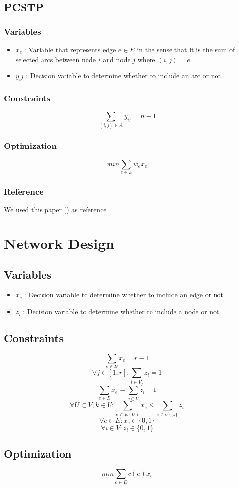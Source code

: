 \documentclass{article}
\begin{document}
\subsection{PCSTP}

\subsubsection{Variables}
\begin{itemize}
	\item $x_e$ : Variable that represents edge $e \in E$ in the sense that it is the sum of selected arcs between node $i$ and node $j$ where $(i,j) = e$ 
	\item $y_ij$ : Decision variable to determine whether to include an arc or not
\end{itemize}

\subsubsection{Constraints}
\[ \sum_{(i,j)\in A}y_{ij} = n-1 \]

\subsubsection{Optimization}
\[ min \sum_{e\in E}w_ex_e \]

\subsubsection{Reference}
We used this paper (\cite{prize_collecting_steiner_tree_problem}) as reference

\clearpage

\section{Network Design}

\subsection{Variables}
\begin{itemize}
	\item $x_e$ : Decision variable to determine whether to include an edge or not
	\item $z_i$ : Decision variable to determine whether to include a node or not
\end{itemize}

\subsection{Constraints}
\[ \sum_{e\in E}x_e = r-1 \]
\[ \forall j \in [1,r] : \sum_{i\in V_j}z_i = 1 \]
\[ \sum_{e\in E}x_e = \sum_{i\in V}z_i - 1 \]
\[ \forall U \subset V, k \in U : \sum_{e\in E(U)}x_e \leq \sum_{i\in U \setminus \{k\}}z_i \]
\[ \forall e \in E : x_e \in \{0,1\} \]
\[ \forall i \in V : z_i \in \{0,1\} \]

\subsection{Optimization}
\[ min \sum_{e\in E}c(e)x_e \]

\clearpage

 

\end{document}
